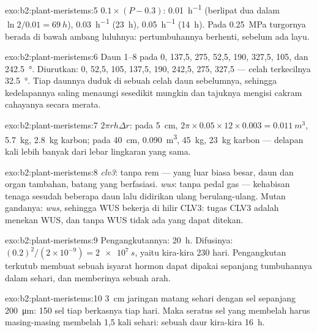 \begin{solution}{exo:b2:plant-meristems:5}
$0.1\times(P - 0.3)$: \qty{0.01}{h^{-1}} (berlipat dua dalam
$\ln 2/0.01 =
\qty{69}{h}$), \qty{0.03}{h^{-1}} (\qty{23}{h}),
\qty{0.05}{h^{-1}} (\qty{14}{h}). Pada \qty{0.25}{MPa} turgornya berada
di bawah ambang luluhnya: pertumbuhannya berhenti, sebelum ada layu.
\end{solution}

\begin{solution}{exo:b2:plant-meristems:6}
Daun 1--8 pada 0, 137,5, 275, 52,5, 190, 327,5, 105, dan
\qty{242.5}{\degree}. Diurutkan: 0, 52,5, 105, 137,5, 190, 242,5, 275,
327,5 --- celah terkecilnya \qty{32.5}{\degree}. Tiap daunnya duduk di
sebuah celah daun sebelumnya, sehingga kedelapannya saling menaungi
sesedikit mungkin dan tajuknya mengisi cakram cahayanya secara merata.
\end{solution}

\begin{solution}{exo:b2:plant-meristems:7}
$2\pi r h\Delta r$: pada \qty{5}{cm}, $2\pi\times 0.05\times 12\times
0.003 = \qty{0.011}{m^3}$, \qty{5.7}{kg}, \qty{2.8}{kg} karbon; pada
\qty{40}{cm}, \qty{0.090}{m^3}, \qty{45}{kg}, \qty{23}{kg} karbon
--- delapan kali lebih banyak dari lebar lingkaran yang sama.
\end{solution}

\begin{solution}{exo:b2:plant-meristems:8}
\emph{clv3}: tanpa rem ---  yang luar biasa besar, daun dan
organ  tambahan, batang yang berfasiasi. \emph{wus}: tanpa pedal
gas ---  kehabisan tenaga sesudah beberapa daun lalu
didirikan ulang berulang-ulang. Mutan gandanya:  \emph{wus},
sehingga WUS bekerja di hilir CLV3: tugas CLV3 adalah menekan WUS, dan
tanpa WUS tidak ada yang dapat ditekan.
\end{solution}

\begin{solution}{exo:b2:plant-meristems:9}
Pengangkutannya: \qty{20}{h}. Difusinya: $(0.2)^{2}/(2\times 10^{-9}) =
\qty{2e7}{s}$, yaitu kira-kira 230 hari. Pengangkutan terkutub membuat
sebuah isyarat hormon dapat dipakai sepanjang tumbuhannya dalam sehari,
dan memberinya sebuah arah.
\end{solution}

\begin{solution}{exo:b2:plant-meristems:10}
\qty{3}{cm} jaringan matang sehari dengan sel sepanjang
\qty{200}{\micro m}: \num{150} sel tiap berkasnya tiap hari. Maka
seratus sel yang membelah harus masing-masing membelah 1,5 kali sehari:
sebuah daur kira-kira \qty{16}{h}.
\end{solution}

